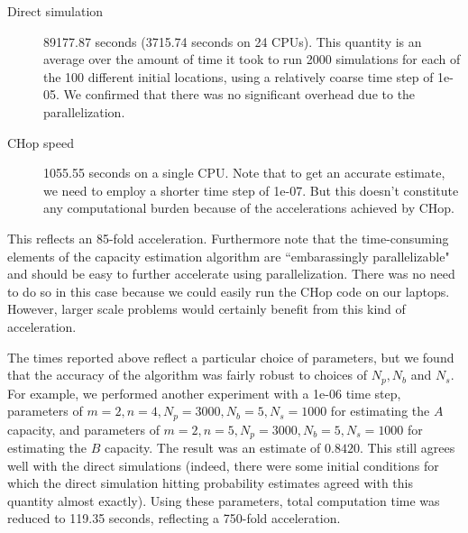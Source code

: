 


\begin{description}
\item[Direct simulation] 89177.87 seconds (3715.74 seconds on 24 CPUs).  This quantity is an average over the amount of time it took to run 2000 simulations for each of the 100 different initial locations, using a relatively coarse time step of 1e-05.  We confirmed that there was no significant overhead due to the parallelization.




\item[CHop speed] 1055.55 seconds on a single CPU. Note that to get an accurate estimate, we need to employ a shorter time step of 1e-07. But this doesn't constitute any computational burden because of the accelerations achieved by CHop.

\end{description}

This reflects an 85-fold acceleration.  Furthermore note that the time-consuming elements of the capacity estimation algorithm are ``embarassingly parallelizable" and should be easy to further accelerate using parallelization.  There was no need to do so in this case because we could easily run the CHop code on our laptops.  However, larger scale problems would certainly benefit from this kind of acceleration.  




The times reported above reflect a particular choice of parameters, but we found that the accuracy of the algorithm was fairly robust to choices of $N_p, N_b$ and $N_s$.  For example, we performed another experiment with a 1e-06 time step, parameters of $ m = 2, n = 4, N_p = 3000, N_b = 5, N_s = 1000 $ for estimating the $A$ capacity, and parameters of $ m = 2, n = 5, N_p = 3000, N_b = 5, N_s = 1000 $ for estimating the $B$ capacity.  The result was an estimate of $0.8420$. This still agrees well with the direct simulations (indeed, there were some initial conditions for which the direct simulation hitting probability estimates agreed with this quantity almost exactly).  Using these parameters, total computation time was reduced to 119.35 seconds, reflecting a 750-fold acceleration.

